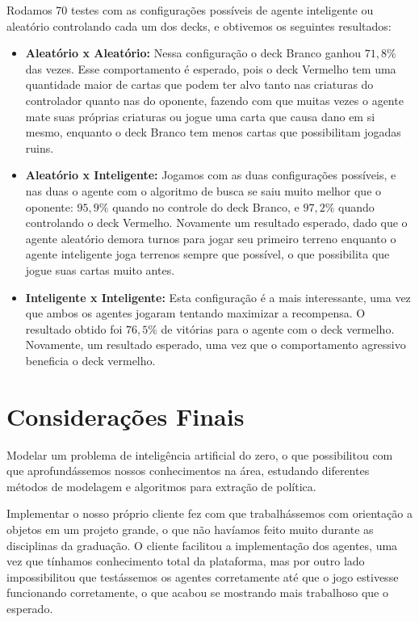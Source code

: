 \documentclass[dvipsnames]{book}
\begin{document}
Rodamos 70 testes com as configurações possíveis de agente inteligente ou aleatório controlando
cada um dos decks, e obtivemos os seguintes resultados:
\begin{itemize}
  \item \textbf{Aleatório x Aleatório:} Nessa configuração o deck Branco ganhou $71,8\%$ das vezes.
  Esse comportamento é esperado, pois o deck Vermelho tem uma quantidade maior de cartas que podem
  ter alvo tanto nas criaturas do controlador quanto nas do oponente, fazendo com que muitas vezes
  o agente mate suas próprias criaturas ou jogue uma carta que causa dano em si mesmo, enquanto o
  deck Branco tem menos cartas que possibilitam jogadas ruins.

  \item \textbf{Aleatório x Inteligente:} Jogamos com as duas configurações possíveis, e nas duas
  o agente com o algoritmo de busca se saiu muito melhor que o oponente: $95,9\%$ quando no
  controle do deck Branco, e $97,2\%$ quando controlando o deck Vermelho. Novamente um resultado
  esperado, dado que o agente aleatório demora turnos para jogar seu primeiro terreno enquanto o
  agente inteligente joga terrenos sempre que possível, o que possibilita que jogue suas cartas
  muito antes.

  \item \textbf{Inteligente x Inteligente:} Esta configuração é a mais interessante, uma vez que
  ambos os agentes jogaram tentando maximizar a recompensa. O resultado obtido foi $76,5\%$ de
  vitórias para o agente com o deck vermelho. Novamente, um resultado esperado, uma vez que o
  comportamento agressivo beneficia o deck vermelho.
\end{itemize}

\chapter{Considerações Finais}
Modelar um problema de inteligência artificial do zero, o que possibilitou com que aprofundássemos
nossos conhecimentos na área, estudando diferentes métodos de modelagem e algoritmos para extração
de política.

Implementar o nosso próprio cliente fez com que trabalhássemos com orientação a objetos em um
projeto grande, o que não havíamos feito muito durante as disciplinas da graduação. O cliente
facilitou a implementação dos agentes, uma vez que tínhamos conhecimento total da plataforma, mas
por outro lado impossibilitou que testássemos os agentes corretamente até que o jogo estivesse
funcionando corretamente, o que acabou se mostrando mais trabalhoso que o esperado.
\end{document}
